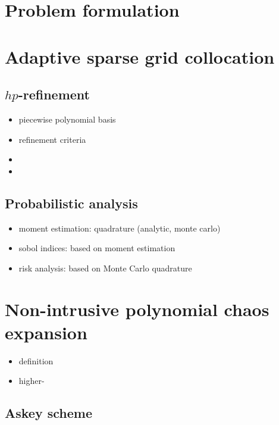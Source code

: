 \section{Problem formulation}
\label{sec:problem-formulation}

\section{Adaptive sparse grid collocation}
\label{sec:adaptive-sparse-grid}

\subsection{$hp$-refinement}
\label{sec:hp-refinement}

\begin{itemize}
\item piecewise polynomial basis
\item refinement criteria
\item {}
\item {}
\end{itemize}

\subsection{Probabilistic analysis}
\label{sec:probabi-analysis}

\begin{itemize}
\item moment estimation: quadrature (analytic, monte carlo)
\item sobol indices: based on moment estimation
\item risk analysis: based on Monte Carlo quadrature
\end{itemize}

\section{Non-intrusive polynomial chaos expansion}
\label{sec:non-intr-polyn}

\begin{itemize}
\item definition
\item higher-
\end{itemize}

\subsection{Askey scheme}
\label{sec:askey-scheme}

